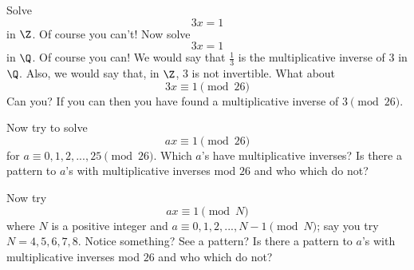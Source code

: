 \mbox{}
  \begin{myenum}
  \item  Solve
    \[
      3x = 1
    \]
    in $\Z$. Of course you can't! Now solve
    \[
      3x = 1
    \]
    in $\Q$. Of course you can!
    We would say that $\frac{1}{3}$ is the multiplicative
    inverse of $3$ in $\Q$.
    Also, we would say that, in $\Z$, $3$ is not invertible.
    What about
    \[
      3x \equiv 1 \pmod{26}
    \]
  Can you? If you can then you have found a multiplicative inverse of
  $3 \pmod{26}$.
  \item
    Now try to solve
    \[
      ax \equiv 1 \pmod{26}
    \]
    for $a \equiv 0, 1, 2, ..., 25 \pmod{26}$.
    Which $a$'s have multiplicative inverses?
    Is there a pattern to $a$'s with multiplicative inverses mod $26$ and who
    which do not?
  \item
    Now try
    \[
      ax \equiv 1 \pmod{N}
    \]
    where $N$ is a positive integer and $a \equiv 0, 1, 2, ..., N - 1 \pmod{N}$; say you try $N = 4, 5, 6, 7, 8$.
    Notice something? See a pattern?
    Is there a pattern to $a$'s with multiplicative inverses mod $26$ and who
    which do not?
  \end{myenum}

